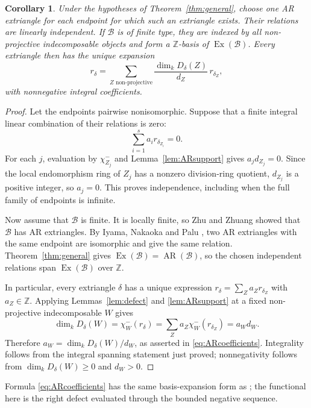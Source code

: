 \documentclass[pdflatex,sn-mathphys-num]{sn-jnl}
\numberwithin{equation}{section}
\newtheorem{corollary}[theorem]{Corollary}
\theoremstyle{definition}
\theoremstyle{remark}\newtheorem{remark}[theorem]{Remark}
\newcommand{\Ex}{\operatorname{Ex}}
\newcommand{\AR}{\operatorname{AR}}
\newcommand{\dimk}{\dim_k}
\begin{document}
\begin{corollary}\label{cor:ARbasis}
Under the hypotheses of Theorem~\ref{thm:general}, choose one AR
extriangle for each endpoint for which such an
extriangle exists. Their relations are linearly independent. If
$\mathcal B$ is of finite type, they are indexed by all
non-projective indecomposable objects and form a $\mathbb Z$-basis
of $\Ex(\mathcal B)$. Every extriangle then has the unique expansion
\begin{equation}\label{eq:ARcoefficients}
 r_\delta=\sum_{Z\text{ non-projective}}
       \frac{\dimk D_\delta(Z)}{d_Z}\,r_{\delta_Z},
\end{equation}
with nonnegative integral coefficients.
\end{corollary}
\begin{proof}
Let the endpoints pairwise nonisomorphic. Suppose that a finite
integral linear combination of their relations is zero:
\[
 \sum_{i=1}^s a_i r_{\delta_{Z_i}}=0.
\]
For each $j$, evaluation by $\chi^-_{Z_j}$ and
Lemma~\ref{lem:ARsupport} gives $a_jd_{Z_j}=0$. Since the local
endomorphism ring of $Z_j$ has a nonzero division-ring quotient,
$d_{Z_j}$ is a positive integer, so $a_j=0$. This proves independence,
including when the full family of endpoints is infinite.

Now assume that $\mathcal B$ is finite. It is locally finite, so
Zhu and Zhuang \cite[Theorem 3.12]{ZZ} showed that $\mathcal B$ has AR extriangles. By Iyama, Nakaoka and Palu
\cite[Proposition 2.6]{INP}, two AR extriangles with the same endpoint
are isomorphic and give the same relation. Theorem~\ref{thm:general}
gives $\Ex(\mathcal B)=\AR(\mathcal B)$, so the chosen independent
relations span $\Ex(\mathcal B)$ over $\mathbb Z$.

In particular, every extriangle $\delta$ has a unique expression
$r_\delta=\sum_Z a_Zr_{\delta_Z}$ with $a_Z\in\mathbb Z$.
Applying Lemmas~\ref{lem:defect} and \ref{lem:ARsupport} at a fixed
non-projective indecomposable $W$ gives
\[
 \dimk D_\delta(W)=\chi^-_W(r_\delta)
    =\sum_Z a_Z\chi^-_W(r_{\delta_Z})=a_Wd_W.
\]
Therefore $a_W=\dimk D_\delta(W)/d_W$, as asserted in
\eqref{eq:ARcoefficients}. Integrality follows from the integral
spanning statement just proved; nonnegativity follows from
$\dimk D_\delta(W)\geq0$ and $d_W>0$.
\end{proof}

Formula \eqref{eq:ARcoefficients} has the same basis-expansion form as
\cite[Theorem 4.13 and Corollary 4.14]{PPPP}; the functional here is
the right defect evaluated through the bounded negative sequence.
\end{document}

